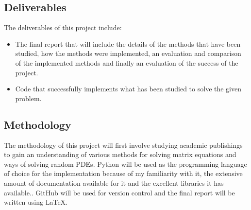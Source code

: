 \documentclass[11pt]{article}
\numberwithin{equation}{section}
\begin{document}
\subsection{Deliverables}
The deliverables of this project include:
\begin{itemize}
\item The final report that will include the details of the methods that have been studied, how the methods were implemented, an evaluation and comparison of the implemented methods and finally an evaluation of the success of the project.  
\item Code that successfully implements what has been studied to solve the given problem.
\end{itemize}

\subsection{Methodology}
The methodology of this project will first involve studying academic publishings to gain an understanding of various methods for solving matrix equations and ways of solving random PDEs. Python will be used as the programming language of choice for the implementation because of my familiarity with it, the extensive amount of documentation available for it and the excellent libraries it has available.. GitHub will be used for version control and the final report will be written using \LaTeX. 

%
%
\end{document}
